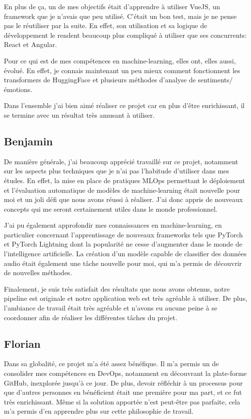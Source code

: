 En plus de ça, un de mes objectifs était d'apprendre à utiliser VueJS, un framework que je n'avais que peu utilisé. C'était un bon test, mais je ne pense pas le réutiliser par la suite. En effet, son utilisation et sa logique de développement le rendent beaucoup plus compliqué à utiliser que ses concurrents: React et Angular.

Pour ce qui est de mes compétences en machine-learning, elles ont, elles aussi, évolué. En effet, je connais maintenant un peu mieux comment fonctionnent les transformers de HuggingFace et plusieurs méthodes d'analyse de sentiments/émotions.

Dans l'ensemble j'ai bien aimé réaliser ce projet car en plus d'être enrichissant, il se termine avec un résultat très amusant à utiliser.

\subsection*{Benjamin}

De manière générale, j'ai beaucoup apprécié travaillé sur ce projet, notamment sur les aspects plus techniques que je n'ai pas l'habitude d'utiliser dans mes études. En effet, la mise en place de pratiques MLOps permettant le déploiement et l'évaluation automatique de modèles de machine-learning était nouvelle pour moi et un joli défi que nous avons réussi à réaliser. J'ai donc appris de nouveaux concepts qui me seront certainement utiles dans le monde professionnel.

J'ai pu également approfondir mes connaissances en machine-learning, en particulier concernant l'apprentissage de nouveaux frameworks tels que PyTorch et PyTorch Lightning dont la popularité ne cesse d'augmenter dans le monde de l'intelligence artificielle. La création d'un modèle capable de classifier des données audio était également une tâche nouvelle pour moi, qui m'a permis de découvrir de nouvelles méthodes.

Finalement, je suis très satisfait des résultats que nous avons obtenus, notre pipeline est originale et notre application web est très agréable à utiliser. De plus, l'ambiance de travail était très agréable et n'avons eu aucune peine à se coordonner afin de réaliser les différentes tâches du projet.

\subsection*{Florian}
Dans sa globalité, ce projet m'a été assez bénéfique. Il m'a permis un de consolider mes compétences en DevOps, notamment en découvrant la plate-forme GitHub, inexplorée jusqu'à ce jour. De plus, devoir réfléchir à un processus pour que d'autres personnes en bénéficient était une première pour ma part, et ce fut très enrichissant. Même si la solution apportée n'est peut-être pas parfaite, cela m'a permis d'en apprendre plus sur cette philosophie de travail.

